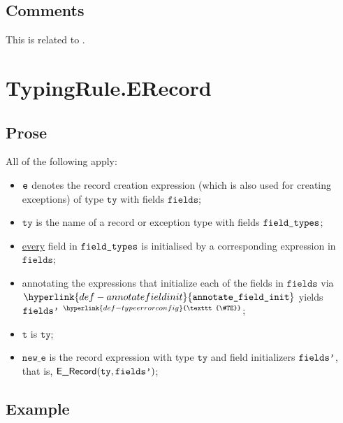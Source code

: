 \documentclass{book}
\newcommand\TypeErrorConfig[0]{\hyperlink{def-typeerrorconfig}{\texttt{\#TE}}}
\newcommand\ProseOrTypeError[0]{\hyperlink{def-proseortypeerror}{$^{\TypeErrorConfig}$}}
\newcommand\annotatefieldinit[0]{\hyperlink{def-annotatefieldinit}{\texttt{annotate\_field\_init}}}
\newcommand\vt[0]{\texttt{t}}
\newcommand\tty[0]{\texttt{ty}}
\newcommand\fields[0]{\texttt{fields}}
\newcommand\newe[0]{\texttt{new\_e}}
\begin{document}
\subsection{Comments}
  This is related to .

\section{TypingRule.ERecord \label{sec:TypingRule.ERecord}}

\subsection{Prose}
All of the following apply:
\begin{itemize}
  \item $\texttt{e}$ denotes the record creation expression (which is also used for creating exceptions) of type $\tty$ with fields $\fields$;
  \item $\tty$ is the name of a record or exception type with fields $\texttt{field\_types}$;
  \item \underline{every} field in $\texttt{field\_types}$ is initialised by a corresponding expression in $\fields$;
  \item annotating the expressions that initialize each of the fields in $\fields$ via \\
        $\annotatefieldinit$ yields $\texttt{fields'}$ \ProseOrTypeError;
  \item $\vt$ is $\tty$;
  \item $\newe$ is the record expression with type $\tty$ and field initializers $\texttt{fields'}$, that is, $\ERecord(\tty, \fieldsp)$;
\end{itemize}

\subsection{Example}

\end{document}

